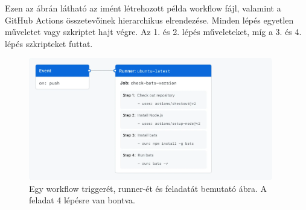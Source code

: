 Ezen az ábrán látható az imént létrehozott példa workflow fájl, valamint a GitHub Actions összetevőinek hierarchikus elrendezése. Minden lépés egyetlen műveletet vagy szkriptet hajt végre. Az 1. és 2. lépés műveleteket, míg a 3. és 4. lépés szkripteket futtat.

\begin{figure}[ht]
    \centering
         \includegraphics[width=0.95\textwidth]{figures/github/overview-actions-event.png}
          \caption{Egy workflow triggerét, runner-ét és feladatát bemutató ábra. A feladat 4 lépésre van bontva. \cite{github}}
           \label{overview-actions-event}
\end{figure}